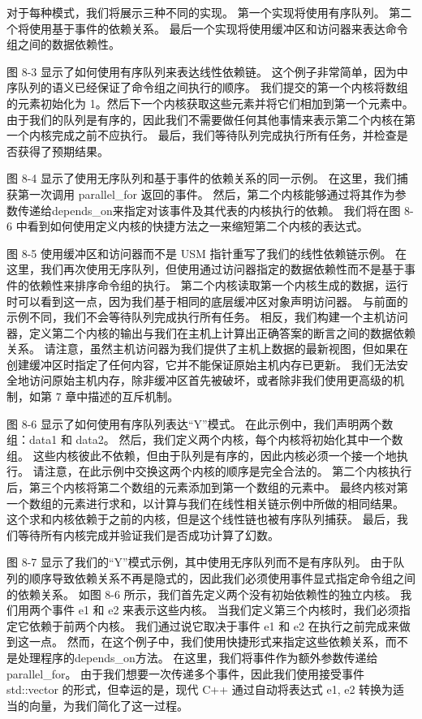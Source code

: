 对于每种模式，我们将展示三种不同的实现。 第一个实现将使用有序队列。 第二个将使用基于事件的依赖关系。 最后一个实现将使用缓冲区和访问器来表达命令组之间的数据依赖性。

图 8-3 显示了如何使用有序队列来表达线性依赖链。 这个例子非常简单，因为中序队列的语义已经保证了命令组之间执行的顺序。 我们提交的第一个内核将数组的元素初始化为 1。然后下一个内核获取这些元素并将它们相加到第一个元素中。 由于我们的队列是有序的，因此我们不需要做任何其他事情来表示第二个内核在第一个内核完成之前不应执行。 最后，我们等待队列完成执行所有任务，并检查是否获得了预期结果。

图 8-4 显示了使用无序队列和基于事件的依赖关系的同一示例。 在这里，我们捕获第一次调用 parallel\_for 返回的事件。 然后，第二个内核能够通过将其作为参数传递给depends\_on来指定对该事件及其代表的内核执行的依赖。 我们将在图 8-6 中看到如何使用定义内核的快捷方法之一来缩短第二个内核的表达式。

图 8-5 使用缓冲区和访问器而不是 USM 指针重写了我们的线性依赖链示例。 在这里，我们再次使用无序队列，但使用通过访问器指定的数据依赖性而不是基于事件的依赖性来排序命令组的执行。 第二个内核读取第一个内核生成的数据，运行时可以看到这一点，因为我们基于相同的底层缓冲区对象声明访问器。 与前面的示例不同，我们不会等待队列完成执行所有任务。 相反，我们构建一个主机访问器，定义第二个内核的输出与我们在主机上计算出正确答案的断言之间的数据依赖关系。 请注意，虽然主机访问器为我们提供了主机上数据的最新视图，但如果在创建缓冲区时指定了任何内容，它并不能保证原始主机内存已更新。 我们无法安全地访问原始主机内存，除非缓冲区首先被破坏，或者除非我们使用更高级的机制，如第 7 章中描述的互斥机制。

图 8-6 显示了如何使用有序队列表达“Y”模式。 在此示例中，我们声明两个数组：data1 和 data2。 然后，我们定义两个内核，每个内核将初始化其中一个数组。 这些内核彼此不依赖，但由于队列是有序的，因此内核必须一个接一个地执行。 请注意，在此示例中交换这两个内核的顺序是完全合法的。 第二个内核执行后，第三个内核将第二个数组的元素添加到第一个数组的元素中。 最终内核对第一个数组的元素进行求和，以计算与我们在线性相关链示例中所做的相同结果。 这个求和内核依赖于之前的内核，但是这个线性链也被有序队列捕获。 最后，我们等待所有内核完成并验证我们是否成功计算了幻数。

图 8-7 显示了我们的“Y”模式示例，其中使用无序队列而不是有序队列。 由于队列的顺序导致依赖关系不再是隐式的，因此我们必须使用事件显式指定命令组之间的依赖关系。 如图 8-6 所示，我们首先定义两个没有初始依赖性的独立内核。 我们用两个事件 e1 和 e2 来表示这些内核。 当我们定义第三个内核时，我们必须指定它依赖于前两个内核。 我们通过说它取决于事件 e1 和 e2 在执行之前完成来做到这一点。 然而，在这个例子中，我们使用快捷形式来指定这些依赖关系，而不是处理程序的depends\_on方法。 在这里，我们将事件作为额外参数传递给parallel\_for。 由于我们想要一次传递多个事件，因此我们使用接受事件 std::vector 的形式，但幸运的是，现代 C++ 通过自动将表达式 {e1, e2} 转换为适当的向量，为我们简化了这一过程。

